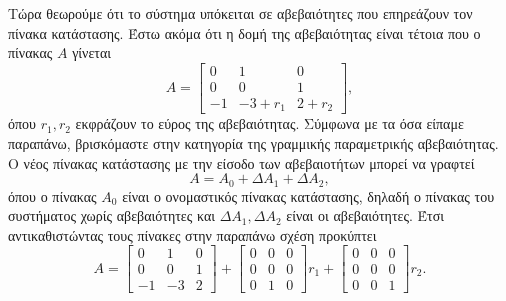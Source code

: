Τώρα θεωρούμε ότι το σύστημα υπόκειται σε αβεβαιότητες που επηρεάζουν τον πίνακα
κατάστασης. Έστω ακόμα ότι η δομή της αβεβαιότητας είναι τέτοια που ο πίνακας
\( A \) γίνεται
\[
    A =
    \begin{bmatrix}
        0 & 1 & 0 \\
        0 & 0 & 1 \\
        -1 & -3 + r_1 & 2 + r_2
    \end{bmatrix},
\]
όπου \( r_1, r_2 \) εκφράζουν το εύρος της αβεβαιότητας. Σύμφωνα με τα όσα
είπαμε παραπάνω, βρισκόμαστε στην κατηγορία της γραμμικής παραμετρικής
αβεβαιότητας. Ο νέος πίνακας κατάστασης με την είσοδο των αβεβαιοτήτων μπορεί
να γραφτεί
\[
    A = A_0 + \Delta A_1 + \Delta A_2,
\]
όπου ο πίνακας \( A_0 \) είναι ο ονομαστικός πίνακας κατάστασης, δηλαδή ο
πίνακας του συστήματος χωρίς αβεβαιότητες και \( \Delta A_1, \Delta A_2 \) είναι
οι αβεβαιότητες. Έτσι αντικαθιστώντας τους πίνακες στην παραπάνω σχέση προκύπτει
\[
    A =
    \begin{bmatrix}
        0 & 1 & 0 \\
        0 & 0 & 1 \\
        -1 & -3 & 2
    \end{bmatrix} +
    \begin{bmatrix}
        0 & 0 & 0 \\
        0 & 0 & 0 \\
        0 & 1 & 0
    \end{bmatrix}r_1 +
    \begin{bmatrix}
        0 & 0 & 0 \\
        0 & 0 & 0 \\
        0 & 0 & 1
    \end{bmatrix}r_2.
\]

